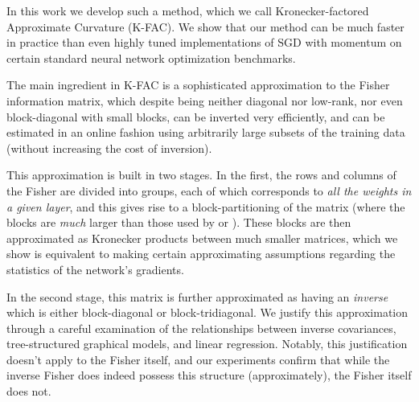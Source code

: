 \documentclass[12pt]{article}
\newcommand{\fullname}{Kronecker-factored Approximate Curvature}
\newcommand{\acronym}{K-FAC}
\begin{document}
In this work we develop such a method, which we call \fullname{} (\acronym{}).  We show that our method can be much faster in practice than even highly tuned implementations of SGD with momentum on certain standard neural network optimization benchmarks.  

The main ingredient in \acronym{} is a sophisticated approximation to the Fisher information matrix, which despite being neither diagonal nor low-rank, nor even block-diagonal with small blocks, can be inverted very efficiently, and can be estimated in an online fashion using arbitrarily large subsets of the training data (without increasing the cost of inversion).  

This approximation is built in two stages.  In the first, the rows and columns of the Fisher are divided into groups, each of which corresponds to \emph{all the weights in a given layer}, and this gives rise to a block-partitioning of the matrix (where the blocks are \emph{much} larger than those used by \citet{TONGA} or \citet{Ollivier}).  These blocks are then approximated as Kronecker products between much smaller matrices, which we show is equivalent to making certain approximating assumptions regarding the statistics of the network's gradients.  

In the second stage, this matrix is further approximated as having an \emph{inverse} which is either block-diagonal or block-tridiagonal.  We justify this approximation through a careful examination of the relationships between inverse covariances, tree-structured graphical models, and linear regression.  Notably, this justification doesn't apply to the Fisher itself, and our experiments confirm that while the inverse Fisher does indeed possess this structure (approximately), the Fisher itself does not.

\end{document}
